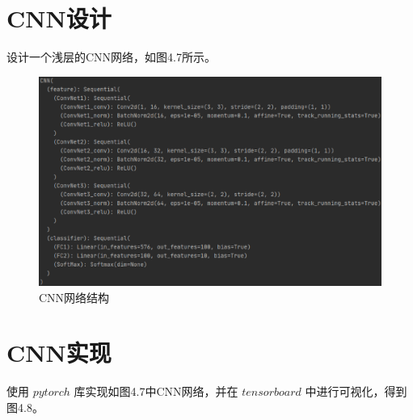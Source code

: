 \documentclass[UTF8, a4paper, 12pt]{report}
\begin{document}
	\section{CNN设计}
		设计一个浅层的CNN网络，如图4.7所示。
		\begin{figure}[!h]
		\centering
		\includegraphics[scale=0.5]{./img/CNNPrint.eps}
		\caption{CNN网络结构}
		\label{fig:4.7}
		\end{figure}

	\section{CNN实现}
		使用 $pytorch$ 库实现如图4.7中CNN网络，并在 $tensorboard$ 中进行可视化，得到图4.8。
\end{document}
